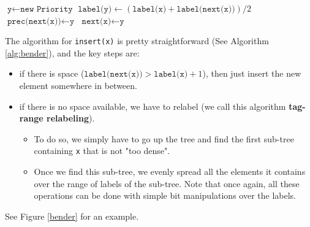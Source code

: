 \documentclass[12pt]{article}
\begin{document}
\begin{algorithm}
\begin{algorithmic}
        \EndIf

        \State $\texttt{y} \gets \texttt{new Priority}$
        \State $\texttt{label(y)} \gets (\texttt{label(x)} + \texttt{label(next(x))}) / 2 $
        \State $\texttt{prec(next(x))} \gets \texttt{y}$
        \State $\texttt{next(x)} \gets \texttt{y}$




    \end{algorithmic}
\end{algorithm}

The algorithm for \texttt{insert(x)} is pretty straightforward (See Algorithm \ref{alg:bender}), and the key steps are:

\begin{itemize}
    \item if there is space ($\texttt{label(next(x))} > \texttt{label(x)} + 1$), then just insert the new element somewhere in between.
    \item if there is no space available, we have to relabel (we call this algorithm \textbf{tag-range relabeling}).
          \begin{itemize}
              \item To do so, we simply have to go up the tree and find the first sub-tree containing \texttt{x} that is not "too dense".
              \item Once we find this sub-tree, we evenly spread all the elements it contains over the range of labels of the sub-tree. Note that once again, all these operations can be done with simple bit manipulations over the labels.
          \end{itemize}
\end{itemize}

See Figure \ref{bender} for an example.
\end{document}
